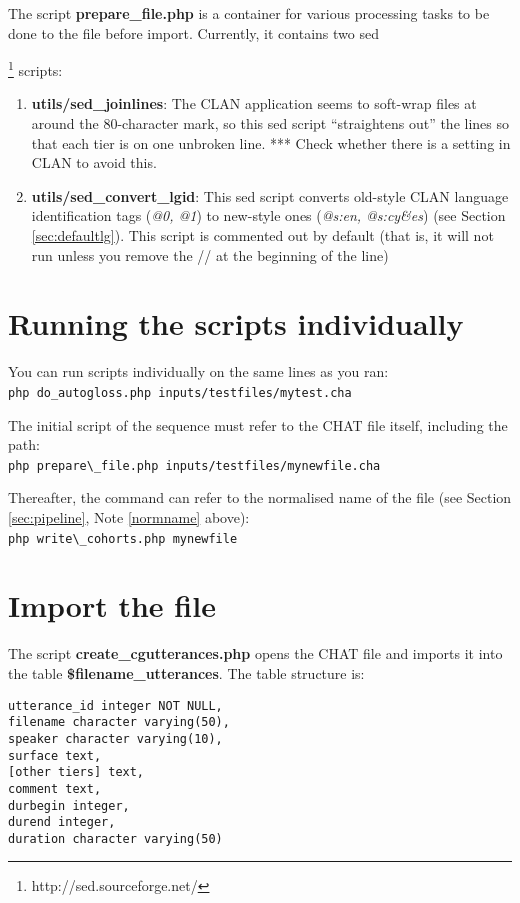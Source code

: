 \documentclass[a4paper,10pt]{article}
\begin{document}
The script \textbf{prepare\_file.php} is a container for various processing tasks to be done to the file before import.  Currently, it contains two sed{\footnote{http://sed.sourceforge.net/} scripts:
\begin{enumerate}
\item \textbf{utils/sed\_joinlines}:  The CLAN application seems to soft-wrap files at around the 80-character mark, so this sed script ``straightens out'' the lines so that each tier is on one unbroken line.  *** Check whether there is a setting in CLAN to avoid this.
\item \textbf{utils/sed\_convert\_lgid}: This sed script converts old-style CLAN language identification tags (\textit{@0, @1}) to new-style ones (\textit{@s:en, @s:cy\&es}) (see Section \ref{sec:defaultlg}).  This script is commented out by default (that is, it will not run unless you remove the // at the beginning of the line)
\end{enumerate}


\section{Running the scripts individually}
\label{sec:runindiv}

You can run scripts individually on the same lines as you ran:\\
\verb|php do_autogloss.php inputs/testfiles/mytest.cha|\

The initial script of the sequence must refer to the CHAT file itself, including the path:\\
\verb|php prepare\_file.php inputs/testfiles/mynewfile.cha|\

Thereafter, the command can refer to the normalised name of the file (see Section \ref{sec:pipeline}, Note \ref{normname} above):\\
\verb|php write\_cohorts.php mynewfile|\


\section{Import the file}
\label{sec:import}

The script \textbf{create\_cgutterances.php} opens the CHAT file and imports it into the table \textbf{\$filename\_utterances}.  
The table structure is:
\begin{verbatim}
utterance_id integer NOT NULL,
filename character varying(50),
speaker character varying(10),
surface text,
[other tiers] text,
comment text,
durbegin integer,
durend integer,
duration character varying(50)
\end{verbatim}

}
\end{document}
